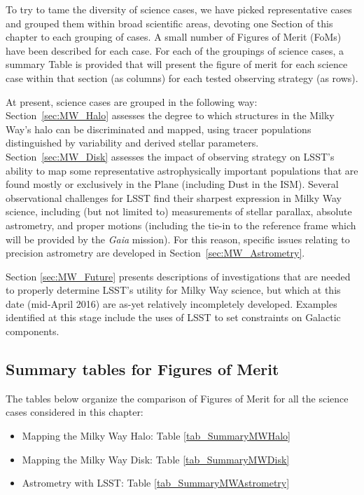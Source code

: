 To try to tame the diversity of science cases, we have picked
representative cases and grouped them within broad scientific areas,
devoting one Section of this chapter to each grouping of cases. A
small number of Figures of Merit (FoMs) have been described for each
case. For each of the groupings of science cases, a summary Table is
provided that will present the figure of merit for each science case
within that section (as columns) for each tested observing strategy
(as rows).

At present, science cases are grouped in the following way:
Section~\ref{sec:MW_Halo} assesses the degree to which structures in the Milky
Way's halo can be discriminated and mapped, using tracer populations
distinguished by variability and derived stellar parameters.
Section~\ref{sec:MW_Disk} assesses the impact of observing strategy on LSST's
ability to map some representative astrophysically important
populations that are found mostly or exclusively in the Plane
(including Dust in the ISM). Several observational challenges for LSST
find their sharpest expression in Milky Way science, including (but
not limited to) measurements of stellar parallax, absolute astrometry,
and proper motions (including the tie-in to the reference frame which
will be provided by the \textit{Gaia} mission). For this reason, specific
issues relating to precision astrometry are developed in
Section~\ref{sec:MW_Astrometry}.

Section \ref{sec:MW_Future} presents descriptions of investigations
that are needed to properly determine LSST's utility for Milky Way
science, but which at this date (mid-April 2016) are as-yet relatively
incompletely developed. Examples identified at this stage include the
uses of LSST to set constraints on Galactic components.


\subsection{Summary tables for Figures of Merit}

The tables below organize the comparison of Figures of Merit for all
the science cases considered in this chapter:
\begin{itemize}
  \item Mapping the Milky Way Halo: Table \ref{tab_SummaryMWHalo}
  \item Mapping the Milky Way Disk: Table \ref{tab_SummaryMWDisk}
  \item Astrometry with LSST: Table \ref{tab_SummaryMWAstrometry}
\end{itemize}

